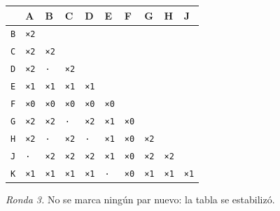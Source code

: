 \documentclass[11pt]{article}
\begin{document}
\begin{center}\footnotesize\begin{tabular}{llllllllll}\toprule
 & A & B & C & D & E & F & G & H & J \\\midrule
\texttt{B} & \texttt{×2} & \texttt{} & \texttt{} & \texttt{} & \texttt{} & \texttt{} & \texttt{} & \texttt{} & \texttt{} \\
\texttt{C} & \texttt{×2} & \texttt{×2} & \texttt{} & \texttt{} & \texttt{} & \texttt{} & \texttt{} & \texttt{} & \texttt{} \\
\texttt{D} & \texttt{×2} & \texttt{·} & \texttt{×2} & \texttt{} & \texttt{} & \texttt{} & \texttt{} & \texttt{} & \texttt{} \\
\texttt{E} & \texttt{×1} & \texttt{×1} & \texttt{×1} & \texttt{×1} & \texttt{} & \texttt{} & \texttt{} & \texttt{} & \texttt{} \\
\texttt{F} & \texttt{×0} & \texttt{×0} & \texttt{×0} & \texttt{×0} & \texttt{×0} & \texttt{} & \texttt{} & \texttt{} & \texttt{} \\
\texttt{G} & \texttt{×2} & \texttt{×2} & \texttt{·} & \texttt{×2} & \texttt{×1} & \texttt{×0} & \texttt{} & \texttt{} & \texttt{} \\
\texttt{H} & \texttt{×2} & \texttt{·} & \texttt{×2} & \texttt{·} & \texttt{×1} & \texttt{×0} & \texttt{×2} & \texttt{} & \texttt{} \\
\texttt{J} & \texttt{·} & \texttt{×2} & \texttt{×2} & \texttt{×2} & \texttt{×1} & \texttt{×0} & \texttt{×2} & \texttt{×2} & \texttt{} \\
\texttt{K} & \texttt{×1} & \texttt{×1} & \texttt{×1} & \texttt{×1} & \texttt{·} & \texttt{×0} & \texttt{×1} & \texttt{×1} & \texttt{×1} \\
\bottomrule\end{tabular}\end{center}
\textit{Ronda 3.} No se marca ningún par nuevo: la tabla se estabilizó.
\end{document}

